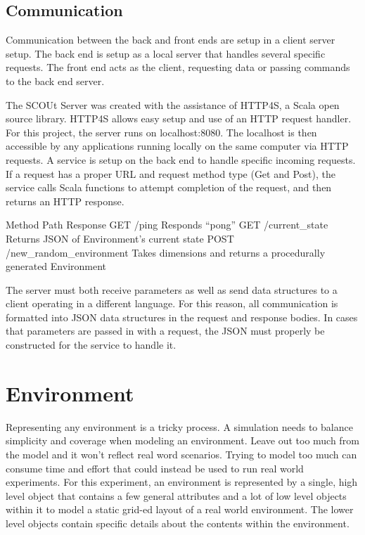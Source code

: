 \subsection{Communication}
Communication between the back and front ends are setup in a client server setup.
The back end is setup as a local server that handles several specific requests.
The front end acts as the client, requesting data or passing commands to the back end server.

The SCOUt Server was created with the assistance of HTTP4S, a Scala open source library. 
HTTP4S allows easy setup and use of an HTTP request handler.
For this project, the server runs on localhost:8080.
The localhost is then accessible by any applications running locally on the same computer via HTTP requests.
A service is setup on the back end to handle specific incoming requests.
If a request has a proper URL and request method type (Get and Post), the service calls Scala functions to attempt completion of the request, and then returns an HTTP response.

Method	Path	Response
GET	/ping	Responds “pong”
GET	/current_state	Returns JSON of Environment’s current state
POST	/new_random_environment	Takes dimensions and returns a procedurally generated Environment

The server must both receive parameters as well as send data structures to a client operating in a different language.
For this reason, all communication is formatted into JSON data structures in the request and response bodies.
In cases that parameters are passed in with a request, the JSON must properly be constructed for the service to handle it.



\section{Environment}
Representing any environment is a tricky process.
A simulation needs to balance simplicity and coverage when modeling an environment.
Leave out too much from the model and it won’t reflect real word scenarios.
Trying to model too much can consume time and effort that could instead be used to run real world experiments.
For this experiment, an environment is represented by a single, high level object that contains a few general attributes and a lot of low level objects within it to model a static grid-ed layout of a real world environment.
The lower level objects contain specific details about the contents within the environment.


